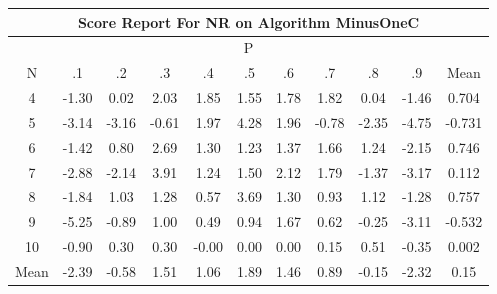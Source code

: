 \documentclass[11pt,a4paper]{report}
\begin{document}
\begin{longtable}{ | c || c | c | c | c | c | c | c | c | c || c |}
\hline
\multicolumn{11}{|c|}{ Score Report For NR on Algorithm MinusOneC} \\
\hline
\multicolumn{11}{|c|}{ P } \\
\hline
N & .1 & .2 & .3 & .4 & .5 & .6 & .7 & .8 & .9 & Mean\\
 \hline
 \hline
 \endhead
  4 &  \cellcolor[HTML]{FFDFDF} -1.30 &  \cellcolor[HTML]{FFFFFF} 0.02 &  \cellcolor[HTML]{CFCFFF} 2.03 &  \cellcolor[HTML]{CFCFFF} 1.85 &  \cellcolor[HTML]{D7D7FF} 1.55 &  \cellcolor[HTML]{CFCFFF} 1.78 &  \cellcolor[HTML]{CFCFFF} 1.82 &  \cellcolor[HTML]{FFFFFF} 0.04 &  \cellcolor[HTML]{FFD7D7} -1.46 & 0.704 \\
  5 &  \cellcolor[HTML]{FFAFAF} -3.14 &  \cellcolor[HTML]{FFAFAF} -3.16 &  \cellcolor[HTML]{FFEFEF} -0.61 &  \cellcolor[HTML]{CFCFFF} 1.97 &  \cellcolor[HTML]{9797FF} 4.28 &  \cellcolor[HTML]{CFCFFF} 1.96 &  \cellcolor[HTML]{FFEFEF} -0.78 &  \cellcolor[HTML]{FFC7C7} -2.35 &  \cellcolor[HTML]{FF8787} -4.75 & -0.731 \\
  6 &  \cellcolor[HTML]{FFDFDF} -1.42 &  \cellcolor[HTML]{E7E7FF} 0.80 &  \cellcolor[HTML]{BFBFFF} 2.69 &  \cellcolor[HTML]{DFDFFF} 1.30 &  \cellcolor[HTML]{DFDFFF} 1.23 &  \cellcolor[HTML]{DFDFFF} 1.37 &  \cellcolor[HTML]{D7D7FF} 1.66 &  \cellcolor[HTML]{DFDFFF} 1.24 &  \cellcolor[HTML]{FFC7C7} -2.15 & 0.746 \\
  7 &  \cellcolor[HTML]{FFB7B7} -2.88 &  \cellcolor[HTML]{FFC7C7} -2.14 &  \cellcolor[HTML]{9F9FFF} 3.91 &  \cellcolor[HTML]{DFDFFF} 1.24 &  \cellcolor[HTML]{D7D7FF} 1.50 &  \cellcolor[HTML]{C7C7FF} 2.12 &  \cellcolor[HTML]{CFCFFF} 1.79 &  \cellcolor[HTML]{FFDFDF} -1.37 &  \cellcolor[HTML]{FFAFAF} -3.17 & 0.112 \\
  8 &  \cellcolor[HTML]{FFCFCF} -1.84 &  \cellcolor[HTML]{E7E7FF} 1.03 &  \cellcolor[HTML]{DFDFFF} 1.28 &  \cellcolor[HTML]{EFEFFF} 0.57 &  \cellcolor[HTML]{9F9FFF} 3.69 &  \cellcolor[HTML]{DFDFFF} 1.30 &  \cellcolor[HTML]{E7E7FF} 0.93 &  \cellcolor[HTML]{DFDFFF} 1.12 &  \cellcolor[HTML]{FFDFDF} -1.28 & 0.757 \\
  9 &  \cellcolor[HTML]{FF7878} -5.25 &  \cellcolor[HTML]{FFE7E7} -0.89 &  \cellcolor[HTML]{E7E7FF} 1.00 &  \cellcolor[HTML]{EFEFFF} 0.49 &  \cellcolor[HTML]{E7E7FF} 0.94 &  \cellcolor[HTML]{D7D7FF} 1.67 &  \cellcolor[HTML]{EFEFFF} 0.62 &  \cellcolor[HTML]{FFF7F7} -0.25 &  \cellcolor[HTML]{FFAFAF} -3.11 & -0.532 \\
  10 &  \cellcolor[HTML]{FFE7E7} -0.90 &  \cellcolor[HTML]{F7F7FF} 0.30 &  \cellcolor[HTML]{F7F7FF} 0.30 &  \cellcolor[HTML]{FFFFFF} -0.00 &  \cellcolor[HTML]{FFFFFF} 0.00 &  \cellcolor[HTML]{FFFFFF} 0.00 &  \cellcolor[HTML]{FFFFFF} 0.15 &  \cellcolor[HTML]{EFEFFF} 0.51 &  \cellcolor[HTML]{FFF7F7} -0.35 & 0.002 \\
 \hline
 \hline
Mean &  \cellcolor[HTML]{FFBFBF} -2.39 &  \cellcolor[HTML]{FFEFEF} -0.58 &  \cellcolor[HTML]{D7D7FF} 1.51 &  \cellcolor[HTML]{E7E7FF} 1.06 &  \cellcolor[HTML]{CFCFFF} 1.89 &  \cellcolor[HTML]{D7D7FF} 1.46 &  \cellcolor[HTML]{E7E7FF} 0.89 &  \cellcolor[HTML]{FFFFFF} -0.15 &  \cellcolor[HTML]{FFC7C7} -2.32 &  \cellcolor[HTML]{FFFFFF} 0.15
\end{longtable}
\end{document}
